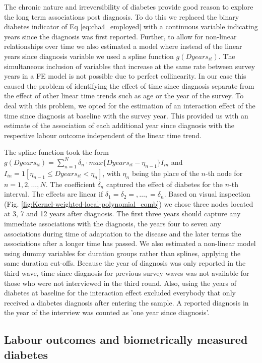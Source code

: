 \documentclass[12pt,english]{article}
\begin{document}
The chronic nature and irreversibility of diabetes provide good reason to explore the long term associations post diagnosis.  To do this we replaced the binary diabetes indicator of Eq \ref{eq:cha4_employed} with a continuous variable indicating years since the diagnosis was first reported. Further, to allow for non-linear relationships over time we also estimated a model where instead of the linear years since diagnosis variable we used a spline function $g(Dyears_{it})$.  The simultaneous inclusion of variables that increase at the same rate between survey years in a \ac{FE} model is not possible due to perfect collinearity. In our case this caused the problem of identifying the effect of time since diagnosis separate from the effect of other linear time trends such as age or the year of the survey.  To deal with this problem, we opted for the estimation of an interaction effect of the time since diagnosis at baseline with the survey year. This provided us with an estimate of the association of each additional year since diagnosis with the respective labour outcome independent of the linear time trend.

The spline function took the form $g(Dyears_{it})=\sum_{n=1}^{N}\delta_{n}\cdot max\{Dyears_{it}-\eta_{n-1}\}I_{in}$
and $I_{in}=1[\eta_{n-1}\leq Dyears_{it}<\eta_{n}]$, with $\eta_{n}$ being the place of the $n$-th node for $n=1,2,\ldots,N$. The coefficient $\delta_{n}$ captured the effect of diabetes for the $n$-th interval. The effects are linear if $\delta_{1}=\delta_{2}=,\ldots,=\delta_{n}$. Based on visual inspection (Fig. \ref{fig:Kernel-weighted-local-polynomial_comb}) we chose three nodes located at 3, 7 and 12 years after diagnosis. The first three years should capture any immediate associations with the diagnosis, the years four to seven any associations during time of adaptation to the disease and the later terms the associations after a longer time has passed. We also estimated a non-linear model using dummy variables for duration groups rather than splines, applying the same duration cut-offs. Because the year of diagnosis was only reported in the third wave, time since diagnosis for previous survey waves was not available for those who were not interviewed in the third round. Also, using the years of diabetes at baseline for the interaction effect excluded everybody that only received a diabetes diagnosis after entering the sample. A reported diagnosis in the year of the interview was counted as 'one year since diagnosis'.

\subsection{\label{sec:Biomarker Strategy}Labour outcomes and biometrically measured diabetes}
\end{document}
